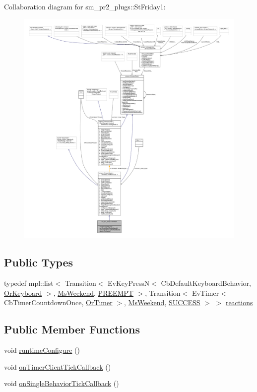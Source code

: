 Collaboration diagram for sm\+\_\+pr2\+\_\+plugs\+:\+:St\+Friday1\+:
\nopagebreak
\begin{figure}[H]
\begin{center}
\leavevmode
\includegraphics[width=350pt]{structsm__pr2__plugs_1_1StFriday1__coll__graph}
\end{center}
\end{figure}
\subsection*{Public Types}
\begin{DoxyCompactItemize}
\item 
typedef mpl\+::list$<$ Transition$<$ Ev\+Key\+PressN$<$ Cb\+Default\+Keyboard\+Behavior, \hyperlink{classsm__pr2__plugs_1_1OrKeyboard}{Or\+Keyboard} $>$, \hyperlink{classsm__pr2__plugs_1_1MsWeekend}{Ms\+Weekend}, \hyperlink{classPREEMPT}{P\+R\+E\+E\+M\+PT} $>$, Transition$<$ Ev\+Timer$<$ Cb\+Timer\+Countdown\+Once, \hyperlink{classsm__pr2__plugs_1_1OrTimer}{Or\+Timer} $>$, \hyperlink{classsm__pr2__plugs_1_1MsWeekend}{Ms\+Weekend}, \hyperlink{classSUCCESS}{S\+U\+C\+C\+E\+SS} $>$ $>$ \hyperlink{structsm__pr2__plugs_1_1StFriday1_abf46be04212b7bc432fd339c0d959232}{reactions}
\end{DoxyCompactItemize}
\subsection*{Public Member Functions}
\begin{DoxyCompactItemize}
\item 
void \hyperlink{structsm__pr2__plugs_1_1StFriday1_afd9f8393ed44035b4b7b2d5cb0340f60}{runtime\+Configure} ()
\item 
void \hyperlink{structsm__pr2__plugs_1_1StFriday1_ab5363782cf79c02cd78fea6efc8ac390}{on\+Timer\+Client\+Tick\+Callback} ()
\item 
void \hyperlink{structsm__pr2__plugs_1_1StFriday1_aa0969475338fde1a92cfa956eef37d63}{on\+Single\+Behavior\+Tick\+Callback} ()
\end{DoxyCompactItemize}

